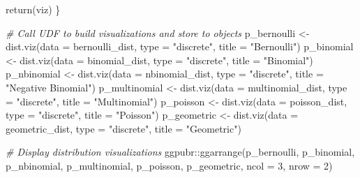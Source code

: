 \documentclass[
]{book}
\newenvironment{Shaded}{\begin{snugshade}}{\end{snugshade}}
\newcommand{\AttributeTok}[1]{\textcolor[rgb]{0.77,0.63,0.00}{#1}}
\newcommand{\CommentTok}[1]{\textcolor[rgb]{0.56,0.35,0.01}{\textit{#1}}}
\newcommand{\DecValTok}[1]{\textcolor[rgb]{0.00,0.00,0.81}{#1}}
\newcommand{\FunctionTok}[1]{\textcolor[rgb]{0.00,0.00,0.00}{#1}}
\newcommand{\NormalTok}[1]{#1}
\newcommand{\OtherTok}[1]{\textcolor[rgb]{0.56,0.35,0.01}{#1}}
\newcommand{\SpecialCharTok}[1]{\textcolor[rgb]{0.00,0.00,0.00}{#1}}
\newcommand{\StringTok}[1]{\textcolor[rgb]{0.31,0.60,0.02}{#1}}
\begin{document}
\begin{Shaded}
\begin{Highlighting}[]
  \FunctionTok{return}\NormalTok{(viz)}
\NormalTok{\}}

\CommentTok{\# Call UDF to build visualizations and store to objects}
\NormalTok{p\_bernoulli }\OtherTok{\textless{}{-}} \FunctionTok{dist.viz}\NormalTok{(}\AttributeTok{data =}\NormalTok{ bernoulli\_dist, }\AttributeTok{type =} \StringTok{"discrete"}\NormalTok{, }\AttributeTok{title =} \StringTok{"Bernoulli"}\NormalTok{)}
\NormalTok{p\_binomial }\OtherTok{\textless{}{-}} \FunctionTok{dist.viz}\NormalTok{(}\AttributeTok{data =}\NormalTok{ binomial\_dist, }\AttributeTok{type =} \StringTok{"discrete"}\NormalTok{, }\AttributeTok{title =} \StringTok{"Binomial"}\NormalTok{)}
\NormalTok{p\_nbinomial }\OtherTok{\textless{}{-}} \FunctionTok{dist.viz}\NormalTok{(}\AttributeTok{data =}\NormalTok{ nbinomial\_dist, }\AttributeTok{type =} \StringTok{"discrete"}\NormalTok{, }\AttributeTok{title =} \StringTok{"Negative Binomial"}\NormalTok{)}
\NormalTok{p\_multinomial }\OtherTok{\textless{}{-}} \FunctionTok{dist.viz}\NormalTok{(}\AttributeTok{data =}\NormalTok{ multinomial\_dist, }\AttributeTok{type =} \StringTok{"discrete"}\NormalTok{, }\AttributeTok{title =} \StringTok{"Multinomial"}\NormalTok{)}
\NormalTok{p\_poisson }\OtherTok{\textless{}{-}} \FunctionTok{dist.viz}\NormalTok{(}\AttributeTok{data =}\NormalTok{ poisson\_dist, }\AttributeTok{type =} \StringTok{"discrete"}\NormalTok{, }\AttributeTok{title =} \StringTok{"Poisson"}\NormalTok{)}
\NormalTok{p\_geometric }\OtherTok{\textless{}{-}} \FunctionTok{dist.viz}\NormalTok{(}\AttributeTok{data =}\NormalTok{ geometric\_dist, }\AttributeTok{type =} \StringTok{"discrete"}\NormalTok{, }\AttributeTok{title =} \StringTok{"Geometric"}\NormalTok{)}
  
\CommentTok{\# Display distribution visualizations}
\NormalTok{ggpubr}\SpecialCharTok{::}\FunctionTok{ggarrange}\NormalTok{(p\_bernoulli, p\_binomial, p\_nbinomial, p\_multinomial, p\_poisson, p\_geometric,}
          \AttributeTok{ncol =} \DecValTok{3}\NormalTok{, }\AttributeTok{nrow =} \DecValTok{2}\NormalTok{)}
\end{Highlighting}
\end{Shaded}
\end{document}
